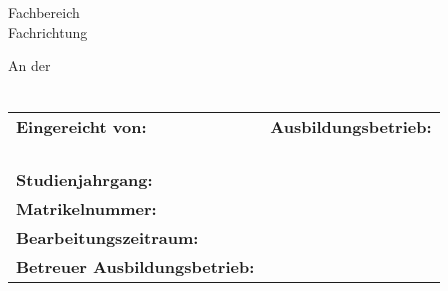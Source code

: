 \begin{titlepage}

	\thispagestyle{plain}

	\begin{figure}[H]
	\begin{flushright}
	\end{flushright}
	\end{figure}
	\vspace{-5pt}
	\begin{center}
		\vspace{2cm}
		\begin{LARGE}
			\art
			\\
			\vspace{16pt}
		\end{LARGE}
		\begin{Huge}
			\titel
			\\		
			\vspace{14pt}
		\end{Huge}
		\begin{LARGE}
			\untertitel	
		\end{LARGE}
	\end{center}

	\begin{center}
		Fachbereich \studienfach\\
		Fachrichtung \fachrichtung
		
		An der \hochschule \\ \campus\\
	\end{center}

	\let\stretchbuffer\arraystretch %
	\renewcommand{\arraystretch}{1.25} %
	\begin{table}[b!]
		\normalsize
		\begin{tabularx}{\textwidth}{lX}
			\textbf{Eingereicht von:} 				& \textbf{Ausbildungsbetrieb:} \\
			\autor 									& \firma \\
			\strassehausnr 							& \firmenstrasse\\
			\plzwohnort								& \firmenort\\
			\\[1cm]
			\textbf{Studienjahrgang:} 				& \jahrgang \\
			\textbf{Matrikelnummer:} 				& \matrikelnr \\
			\textbf{Bearbeitungszeitraum:} 			& \bearbeitungszeitraum \\[0.5cm]
			\textbf{Betreuer Ausbildungsbetrieb:} 	& \betreuer
		\end{tabularx}
	\end{table}
	\renewcommand{\arraystretch}{\stretchbuffer} %
	\clearpage
\end{titlepage}